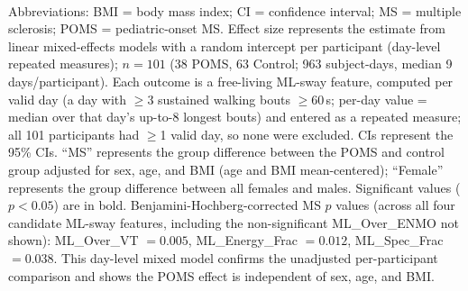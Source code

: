 \begin{table}[t]
\centering
\caption{\textbf{Group Differences in Free-Living Mediolateral-Sway Features Using Linear Mixed-Effects Modeling}}
\label{tab:home_sway_lme}
\setlength{\tabcolsep}{5pt}\renewcommand{\arraystretch}{1.15}
\\[2pt]
{\footnotesize Abbreviations: BMI = body mass index; CI = confidence interval; MS = multiple sclerosis; POMS = pediatric-onset MS. Effect size represents the estimate from linear mixed-effects models with a random intercept per participant (day-level repeated measures); $n=101$ (38 POMS, 63 Control; 963 subject-days, median 9 days/participant). Each outcome is a free-living ML-sway feature, computed per valid day (a day with $\geq$3 sustained walking bouts $\geq$60\,s; per-day value = median over that day's up-to-8 longest bouts) and entered as a repeated measure; all 101 participants had $\geq$1 valid day, so none were excluded. CIs represent the 95\% CIs. ``MS'' represents the group difference between the POMS and control group adjusted for sex, age, and BMI (age and BMI mean-centered); ``Female'' represents the group difference between all females and males. Significant values ($p<0.05$) are in bold. Benjamini-Hochberg-corrected MS $p$ values (across all four candidate ML-sway features, including the non-significant ML\_Over\_ENMO not shown): ML\_Over\_VT $=0.005$, ML\_Energy\_Frac $=0.012$, ML\_Spec\_Frac $=0.038$. This day-level mixed model confirms the unadjusted per-participant comparison and shows the POMS effect is independent of sex, age, and BMI.}
\end{table}
